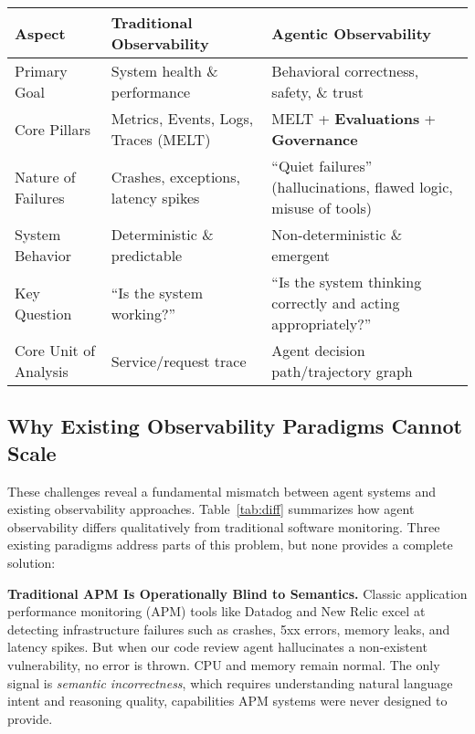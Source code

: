 \documentclass[sigplan,screen,9pt]{acmart}
\begin{document}
\begin{table*}[t]
  \caption{Traditional vs. Agentic Observability: A Comparative Framework}
  \label{tab:diff}
  \centering
  \begin{tabular}{@{}p{3cm}p{5.5cm}p{5.5cm}@{}}
    \toprule
    \textbf{Aspect} &
    \textbf{Traditional Observability} &
    \textbf{Agentic Observability} \\
    \midrule
    Primary Goal &
    System health \& performance &
    Behavioral correctness, safety, \& trust \\
    Core Pillars &
    Metrics, Events, Logs, Traces (MELT)~\cite{li2022observability} &
    MELT + \textbf{Evaluations} + \textbf{Governance} \\
    Nature of Failures &
    Crashes, exceptions, latency spikes &
    ``Quiet failures'' (hallucinations, flawed logic, misuse of tools) \\
    System Behavior &
    Deterministic \& predictable &
    Non-deterministic \& emergent \\
    Key Question &
    ``Is the system working?'' &
    ``Is the system thinking correctly and acting appropriately?'' \\
    Core Unit of Analysis &
    Service/request trace &
    Agent decision path/trajectory graph \\
    \bottomrule
  \end{tabular}
\end{table*}

\subsection{Why Existing Observability Paradigms Cannot Scale}

These challenges reveal a fundamental mismatch between agent systems and existing observability approaches. Table~\ref{tab:diff} summarizes how agent observability differs qualitatively from traditional software monitoring. Three existing paradigms address parts of this problem, but none provides a complete solution:

\textbf{Traditional APM Is Operationally Blind to Semantics.} Classic application performance monitoring (APM) tools like Datadog and New Relic excel at detecting infrastructure failures such as crashes, 5xx errors, memory leaks, and latency spikes. But when our code review agent hallucinates a non-existent vulnerability, no error is thrown. CPU and memory remain normal. The only signal is \emph{semantic incorrectness}, which requires understanding natural language intent and reasoning quality, capabilities APM systems were never designed to provide.
\end{document}
